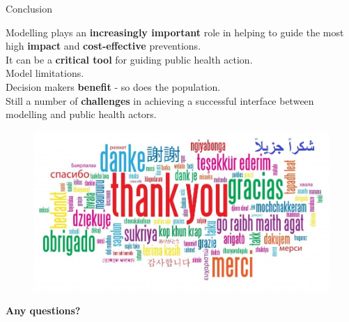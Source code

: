 \documentclass[table,notes]{beamer}\usepackage[]{graphicx}\usepackage[]{color}
\newcommand\unnumbered{\setbeamertemplate{footline}{}}
\begin{document}
\begin{frame}[fragile]{Conclusion}

Modelling plays an \textbf{increasingly important} role in helping to guide the most high \textbf{impact} and \textbf{cost-effective} preventions. \\
\vspace{0.3cm}
It can be a \textbf{critical tool} for guiding public health action. \\
\vspace{0.3cm}
Model limitations. \\ %
\vspace{0.3cm}
Decision makers \textbf{benefit} - so does the population. \\
\vspace{0.3cm}
Still a number of \textbf{challenges} in achieving a successful interface between modelling and public health actors.


\end{frame}

{\unnumbered
\begin{frame}[noframenumbering]{}
\begin{center}
\begin{figure}
  \centering
  \includegraphics[width=\textwidth,height=0.5\textheight,keepaspectratio]{Thank-you-word-cloud.jpg}
\end{figure}

\pause \Huge{\textbf{Any questions?}}

\end{center}
\end{frame}}
\end{document}
